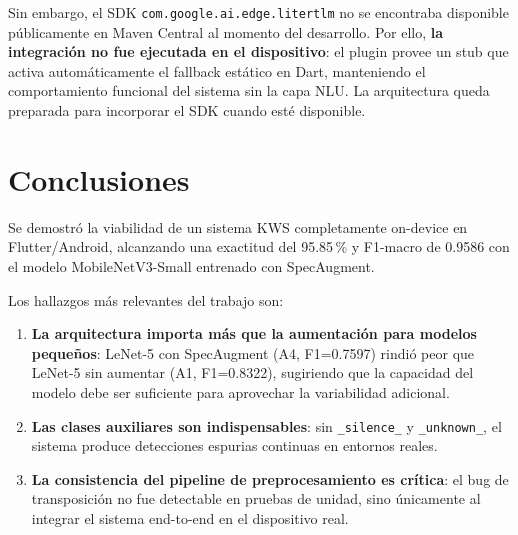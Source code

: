 \documentclass[conference]{IEEEtran}
\begin{document}
Sin embargo, el SDK \texttt{com.google.ai.edge.litertlm} no se encontraba
disponible públicamente en Maven Central al momento del desarrollo.  Por
ello, \textbf{la integración no fue ejecutada en el dispositivo}: el plugin
provee un stub que activa automáticamente el fallback estático en Dart,
manteniendo el comportamiento funcional del sistema sin la capa NLU.  La
arquitectura queda preparada para incorporar el SDK cuando esté disponible.

\section{Conclusiones}

Se demostró la viabilidad de un sistema KWS completamente on-device en
Flutter/Android, alcanzando una exactitud del 95.85\,\% y F1-macro de 0.9586
con el modelo MobileNetV3-Small entrenado con SpecAugment.

Los hallazgos más relevantes del trabajo son:

\begin{enumerate}
  \item \textbf{La arquitectura importa más que la aumentación para modelos
        pequeños}: LeNet-5 con SpecAugment (A4, F1=0.7597) rindió peor que
        LeNet-5 sin aumentar (A1, F1=0.8322), sugiriendo que la capacidad del
        modelo debe ser suficiente para aprovechar la variabilidad adicional.

  \item \textbf{Las clases auxiliares son indispensables}: sin
        \texttt{\_silence\_} y \texttt{\_unknown\_}, el sistema produce
        detecciones espurias continuas en entornos reales.

  \item \textbf{La consistencia del pipeline de preprocesamiento es crítica}:
        el bug de transposición no fue detectable en pruebas de unidad, sino
        únicamente al integrar el sistema end-to-end en el dispositivo real.
\end{enumerate}
\end{document}
